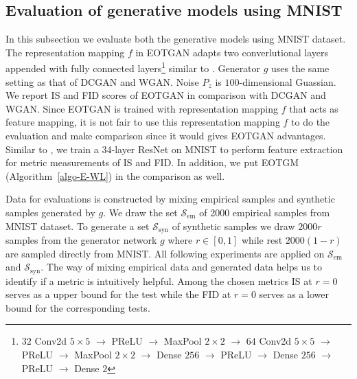 \subsection{Evaluation of generative models using MNIST}
In this subsection we evaluate both the generative models using MNIST dataset.
The representation mapping $f$ in EOTGAN adapts two converlutional layers
appended with fully connected layers\footnote{$32$ Conv2d $5 \times5$
  $\rightarrow$ PReLU $\rightarrow$ MaxPool $2\times2$ $\rightarrow$
  $64$ Conv2d $5\times5$ $\rightarrow$ PReLU $\rightarrow$ MaxPool
  $2\times2$ $\rightarrow$ Dense $256$ $\rightarrow$ PReLU
  $\rightarrow$ Dense $256$ $\rightarrow$ PReLU $\rightarrow$ Dense
  $2$}
similar to \cite{1467314}\cite{1640964}. Generator $g$ uses the same
setting as that of DCGAN and WGAN. Noise $P_z$ is $100$-dimensional Guassian.
We report IS and FID scores of EOTGAN in comparison with DCGAN and WGAN. Since EOTGAN is trained with representation mapping $f$ that
acts as feature mapping, it is not fair to use this representation mapping $f$ to do the
evaluation and make comparison since it would gives EOTGAN
advantages. Similar to \cite{2018arXiv180607755X}, we train a 34-layer
ResNet on MNIST to perform feature extraction for metric measurements
of IS and FID. In addition, we put EOTGM (Algorithm~\autoref{algo-E-WL}) in the comparison as well.

Data for evaluations is constructed by mixing empirical samples and
synthetic samples generated by $g$. We draw the set $\mathcal{S}_{\mathrm{em}}$ of 2000 empirical samples from MNIST dataset. To generate a set $\mathcal{S}_{\mathrm{syn}}$ of synthetic
samples we draw $2000r$ samples from the generator network $g$ where
$r\in[0,1]$ while rest $2000(1-r)$ are sampled directly from
MNIST. All following experiments are applied on
$\mathcal{S}_{\mathrm{em}}$ and $\mathcal{S}_{\mathrm{syn}}$. 
The way of mixing empirical data and generated data helps
us to identify if a metric is intuitively helpful. Among the chosen metrics IS at $r=0$ serves as a upper bound for the test while the FID at $r=0$ serves as a lower bound for the corresponding tests. %

